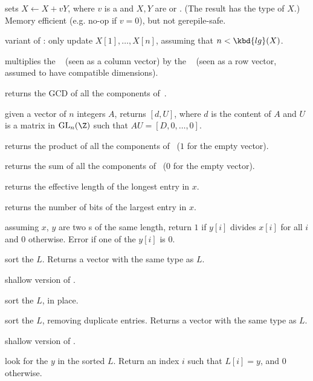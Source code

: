  sets $X\leftarrow X +
vY$, where $v$ is a  and $X,Y$ are  or . (The result
has the type of $X$.) Memory efficient (e.g. no-op if $v = 0$), but not
gerepile-safe.

variant of : only update $X[1], \dots, X[n]$,
assuming that $n < \kbd{lg}(X)$.

 multiplies the ~
(seen as a column vector) by the ~ (seen as a row vector,
assumed to have compatible dimensions).

 returns the GCD of all the components
of~.

 given a vector of $n$ integers $A$, returns $[d,
U]$, where $d$ is the content of $A$ and $U$ is a matrix
in $\text{GL}_n(\Z)$ such that $AU = [D,0, \dots,0]$.

 returns the product of all the components
of~ ($1$ for the empty vector).

 returns the sum of all the components
of~ ($0$ for the empty vector).

 returns the effective length of the longest
entry in $x$.

 returns the number of bits of the largest
entry in $x$.

 assuming $x$, $y$ are two s of the same
length, return $1$ if $y[i]$ divides $x[i]$ for all $i$ and $0$ otherwise.
Error if one of the $y[i]$ is $0$.

 sort the  $L$.
Returns a vector with the same type as $L$.

 shallow version of .

 sort the  $L$, in place.

 sort the  $L$, removing duplicate
entries. Returns a vector with the same type as $L$.

 shallow version of .

 look for the  $y$ in the sorted
 $L$. Return an index $i$ such that $L[i] = y$, and  $0$ otherwise.

